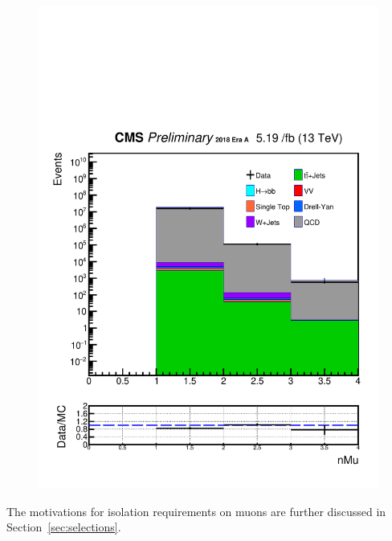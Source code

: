 \begin{figure}[h!]
  \includegraphics[width=0.47\linewidth]{figs/Data_log_AnalysisNote_MS-15_ctauS-10_nMu.pdf}
\end{figure}

The motivations for isolation requirements on muons are further discussed in Section~\ref{sec:selections}.


